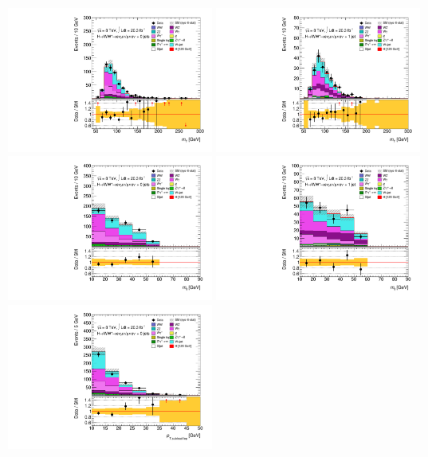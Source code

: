 \begin{figure}[p]
	\includegraphics[width=0.48\textwidth]{tex/backgrounds/emme_CutFRecoil_0jet_sscr_MT_TrackHWW_Clj_mh125_lin}
	\hfill
	\includegraphics[width=0.48\textwidth]{tex/backgrounds/emme_CutFRecoil_1jet_sscr_MT_TrackHWW_Clj_mh125_lin}
	\\
	\includegraphics[width=0.48\textwidth]{tex/backgrounds/emme_CutFRecoil_0jet_sscr_Mll_zoom_mh125_lin}
	\hfill
	\includegraphics[width=0.48\textwidth]{tex/backgrounds/emme_CutFRecoil_1jet_sscr_Mll_zoom_mh125_lin}
	\\
	\includegraphics[width=0.48\textwidth]{tex/backgrounds/emme_CutFRecoil_0jet_sscr_lepPtSubLead_zoom_mh125_lin}

\end{figure}
